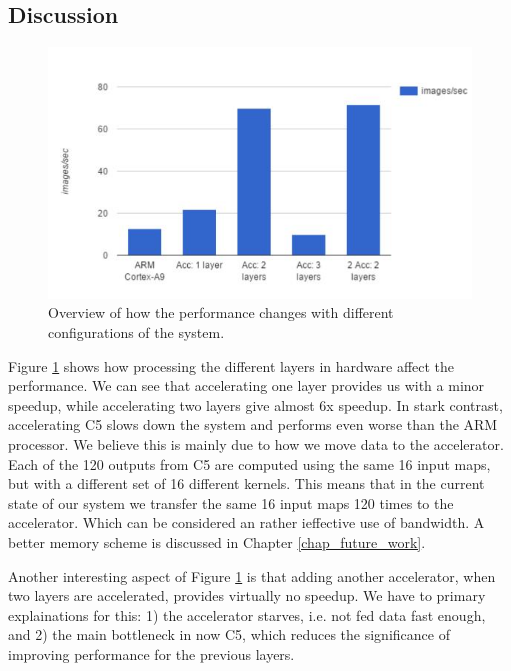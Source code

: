 \subsection{Discussion}

\begin{figure}[h!]
	\centering
	\includegraphics[width=1.0\textwidth]{Figures/Results/results_acc_improvements}
	\caption{Overview of how the performance changes with different configurations of the system.}
	\label{fig_results_acc_improvements}
\end{figure}

Figure \ref{fig_results_acc_improvements} shows how processing the different layers in hardware affect the performance. We can see that accelerating one layer provides us with a minor speedup, while accelerating two layers give almost 6x speedup. In stark contrast, accelerating C5 slows down the system and performs even worse than the ARM processor. We believe this is mainly due to how we move data to the accelerator. Each of the 120 outputs from C5 are computed using the same 16 input maps, but with a different set of 16 different kernels. This means that in the current state of our system we transfer the same 16 input maps 120 times to the accelerator. Which can be considered an rather ieffective use of bandwidth. A better memory scheme is discussed in Chapter \ref{chap_future_work}.

Another interesting aspect of Figure \ref{fig_results_acc_improvements} is that adding another accelerator, when two layers are accelerated, provides virtually no speedup. We have to primary explainations for this: 1) the accelerator starves, i.e. not fed data fast enough, and 2) the main bottleneck in now C5, which reduces the significance of improving performance for the previous layers.

